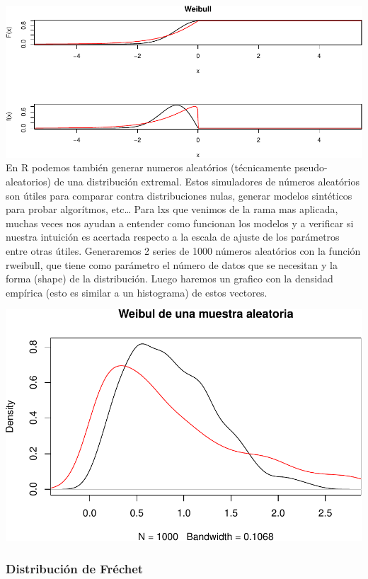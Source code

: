 \documentclass[
  oneside]{book}
\begin{document}
\includegraphics{extremales_files/figure-latex/unnamed-chunk-9-1.pdf} En
R podemos también generar numeros aleatórios (técnicamente
pseudo-aleatorios) de una distribución extremal. Estos simuladores de
números aleatórios son útiles para comparar contra distribuciones nulas,
generar modelos sintéticos para probar algorítmos, etc\ldots{} Para lxs
que venimos de la rama mas aplicada, muchas veces nos ayudan a entender
como funcionan los modelos y a verificar si nuestra intuición es
acertada respecto a la escala de ajuste de los parámetros entre otras
útiles. Generaremos 2 series de 1000 números aleatórios con la función
rweibull, que tiene como parámetro el número de datos que se necesitan y
la forma (shape) de la distribución. Luego haremos un grafico con la
densidad empírica (esto es similar a un histograma) de estos vectores.

\includegraphics{extremales_files/figure-latex/unnamed-chunk-10-1.pdf}

\hypertarget{distribuciuxf3n-de-fruxe9chet}{%
\subsubsection{Distribución de
Fréchet}\label{distribuciuxf3n-de-fruxe9chet}}
\end{document}

